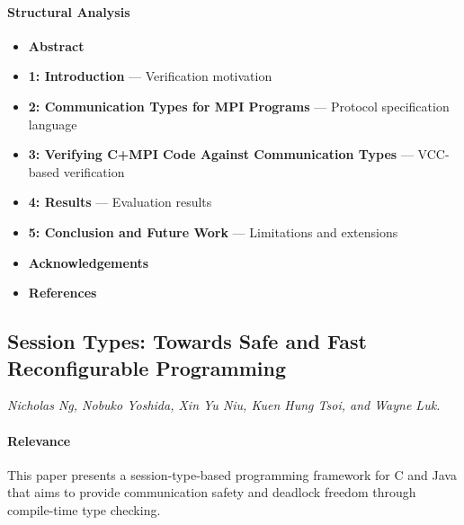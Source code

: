\documentclass{article}
\begin{document}
\paragraph{Structural Analysis}
\begin{itemize}
    \item \textbf{Abstract}

    \item \textbf{1: Introduction} --- Verification motivation

    \item \textbf{2: Communication Types for MPI Programs} --- Protocol specification language

    \item \textbf{3: Verifying C+MPI Code Against Communication Types} --- VCC-based verification

    \item \textbf{4: Results} --- Evaluation results

    \item \textbf{5: Conclusion and Future Work} --- Limitations and extensions

    \item \textbf{Acknowledgements}

    \item \textbf{References}
\end{itemize}


\subsection{Session Types: Towards Safe and Fast Reconfigurable Programming}
\textit{Nicholas Ng, Nobuko Yoshida, Xin Yu Niu, Kuen Hung Tsoi, and Wayne Luk.}~\cite{ng-et-al-2012}

\paragraph{Relevance}
This paper presents a session-type-based programming framework for C and Java that aims to provide communication safety and deadlock freedom through compile-time type checking.
\end{document}
